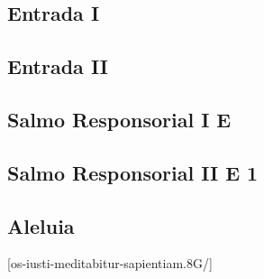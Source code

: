 \def\Prefix{communia/commune-sanctorum/}

\subsection{Entrada I}\label{subsection:communia/commune-sanctorum/introitus-1}

\AllowPageFlush

\subsection{Entrada II}\label{subsection:communia/commune-sanctorum/introitus-2}

\subsection[Salmo Responsorial I]{Salmo Responsorial I \textmd{E \protect\GreStar}}\label{subsection:communia/commune-sanctorum/psalmus-responsorius-1}

\AllowPageFlush

\subsection[Salmo Responsorial II]{Salmo Responsorial II \textmd{E 1}}\label{subsection:communia/commune-sanctorum/psalmus-responsorius-2}

\AllowPageFlush

\label{subsection:communia/commune-sanctorum/psalmus-responsorius-3}


\subsection{Aleluia}\label{subsection:communia/commune-sanctorum/alleluia}
[os-iusti-meditabitur-sapientiam.8G/]


